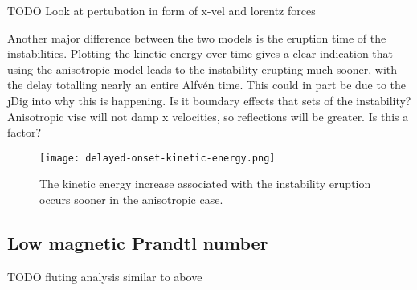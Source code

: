 TODO Look at pertubation in form of x-vel and lorentz forces

Another major difference between the two models is the eruption time of the instabilities. Plotting the kinetic energy over time gives a clear indication that using the anisotropic model leads to the instability erupting much sooner, with the delay totalling nearly an entire Alfv\'en time. This could in part be due to the \j{Dig into why this is happening. Is it boundary effects that sets of the instability? Anisotropic visc will not damp x velocities, so reflections will be greater. Is this a factor?}

\begin{figure}[t]
  \centering
  \texttt{[image: delayed-onset-kinetic-energy.png]}
  \caption{The kinetic energy increase associated with the instability eruption occurs sooner in the anisotropic case.}
  \label{fig:delayed-onset-kinetic-energy}
\end{figure}

\subsection{Low magnetic Prandtl number}

TODO fluting analysis similar to above
